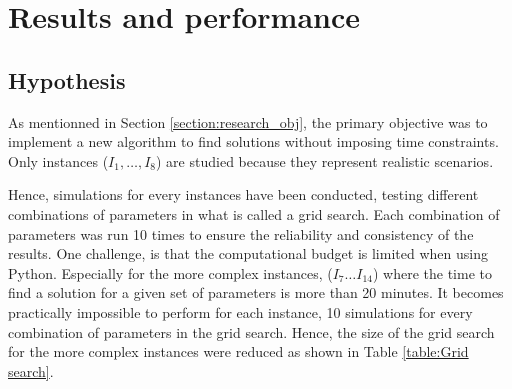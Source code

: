 \chapter{Results and performance}
\label{Chapter5}



\section{Hypothesis}
As mentionned in Section \ref{section:research_obj}, the primary objective was to implement a new algorithm to find solutions without imposing time constraints. Only instances ($I_1, \ldots, I_8$) are studied because they represent realistic scenarios.

Hence, simulations for every instances have been conducted, testing different combinations of parameters in what is called a grid search. Each combination of parameters was run 10 times to ensure the reliability and consistency of the results.
One challenge, is that the computational budget is limited when using Python. Especially for the more complex instances, ($I_7 \ldots I_{14}$) where the time to find a solution for a given set of parameters is more than 20 minutes. It becomes practically impossible to perform for each instance, 10 simulations for every combination of parameters in the grid search. Hence, the size of the grid search for the more complex instances were reduced as shown in Table \ref{table:Grid search}.

